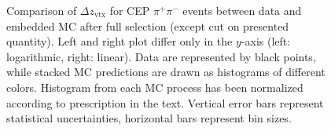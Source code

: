 \begin{figure}[h]
{\begin{subfigure}[b]{\linewidth}
  \end{subfigure}
}\caption[Comparison of $\Delta z_{\text{vtx}}$ for CEP $\pi^{+}\pi^{-}$ events between data and embedded MC.]{Comparison of $\Delta z_{\text{vtx}}$ for CEP $\pi^{+}\pi^{-}$ events between data and embedded MC after full selection (except cut on presented quantity). Left and right plot differ only in the $y$-axis (left: logarithmic, right: linear). Data are represented by black points, while stacked MC predictions are drawn as histograms of different colors. Histogram from each MC process has been normalized according to prescription in the text. Vertical error bars represent statistical uncertainties, horizontal bars represent bin sizes.}\label{fig:Ratio_DeltaZVtx}%
\end{figure}







